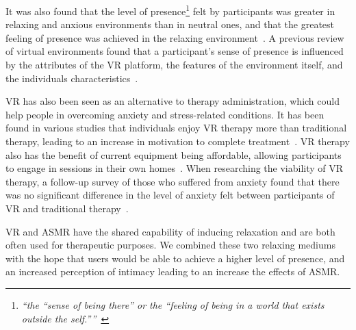 \documentclass{sigchi}
\newcommand{\inlinequote}[1]{\textit{``#1''}}
\begin{document}
It was also found that the level of presence\footnote{\inlinequote{the \inlinequote{sense of being there} or the \inlinequote{feeling of being in a world that exists outside the self.}}~\cite{riva2007affective}} felt by participants was greater in relaxing and anxious environments than in neutral ones, and that the greatest feeling of presence was achieved in the relaxing environment~\cite{riva2007affective}. A previous review of virtual environments found that a participant's sense of presence is influenced by the attributes of the VR platform, the features of the environment itself, and the individuals characteristics~\cite{nash2000review}.

VR has also been seen as an alternative to therapy administration, which could help people in overcoming anxiety and stress-related conditions. It has been found in various studies that individuals enjoy VR therapy more than traditional therapy, leading to an increase in motivation to complete treatment~\cite{kizony2003adapting,morel2015advantages}. VR therapy also has the benefit of current equipment being affordable, allowing participants to engage in sessions in their own homes~\cite{morel2015advantages}. When researching the viability of VR therapy, a follow-up survey of those who suffered from anxiety found that there was no significant difference in the level of anxiety felt between participants of VR and traditional therapy~\cite{safir2011virtual}.

VR and ASMR have the shared capability of inducing relaxation and are both often used for therapeutic purposes. We combined these two relaxing mediums with the hope that users would be able to achieve a higher level of presence, and an increased perception of intimacy leading to an increase the effects of ASMR.
\end{document}
